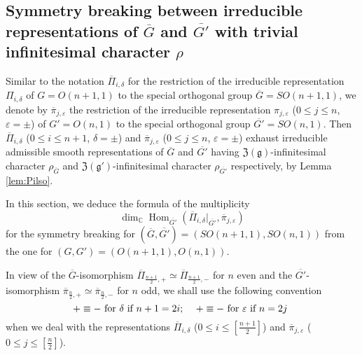 \subsection{Symmetry breaking
 between irreducible representations
 of $\overline G$ and $\overline{G'}$
 with trivial infinitesimal character $\rho$}
Similar to the notation $\overline{\Pi}_{i,\delta}$
 for the restriction of the irreducible representation
 ${\Pi}_{i,\delta}$ of $G=O(n+1,1)$ 
 to the special orthogonal group $\overline G=SO(n+1,1)$, 
 we denote by $\overline \pi_{j,\varepsilon}$
 the restriction of the irreducible representation $\pi_{j,\varepsilon}$
 ($0 \le j \le n$, $\varepsilon=\pm$)
 of $G'=O(n,1)$ to the special orthogonal group $\overline {G'}=SO(n,1)$.  
Then $\overline{\Pi}_{i,\delta}$ ($0 \le i \le n+1$, $\delta=\pm$)
 and $\overline{\pi}_{j,\varepsilon}$ ($0 \le j \le n$, $\varepsilon=\pm$)
 exhaust irreducible admissible smooth representations of $\overline G$
 and $\overline {G'}$ 
 having ${\mathfrak{Z}}({\mathfrak{g}})$-infinitesimal character 
 $\rho_{\overline G}$ 
 and ${\mathfrak{Z}}({\mathfrak{g}}')$-infinitesimal character 
 $\rho_{\overline {G'}}$
 respectively,
 by Lemma \ref{lem:Pilso}.  



In this section,
 we deduce the formula
 of the multiplicity
\[ 
   \dim_{\mathbb{C}} {\operatorname{Hom}}_{\overline {G'}}
   (\overline \Pi_{i,\delta}|_{\overline {G'}}, \overline \pi_{j,\varepsilon})
\]
for the symmetry breaking for 
 $(\overline G, \overline {G'})=(SO(n+1,1), SO(n,1))$ from the one
 for $(G, G')=(O(n+1,1), O(n,1))$.  
 
In view of the $\overline G$-isomorphism
 $\overline{\Pi}_{\frac {n+1}2,+}\simeq \overline{\Pi}_{\frac {n+1}2,-}$
 for $n$ even
 and the $\overline {G'}$-isomorphism
 $\overline{\pi}_{\frac {n}2,+}\simeq \overline{\pi}_{\frac {n}2,-}$
 for $n$ odd, 
 we shall use the following convention
\begin{equation}
\label{eqn:halfsgn}
  \text{$+ \equiv -$ for $\delta$ if $n+1=2i$;
\quad
       $+ \equiv -$ for $\varepsilon$ if $n=2j$
}
\end{equation}
when we deal with the representations
 $\overline{\Pi}_{i,\delta}$
 ($0 \le i \le [\frac{n+1}{2}]$)
 and $\overline{\pi}_{j,\varepsilon}$
 ($0 \le j \le [\frac{n}{2}]$).  



